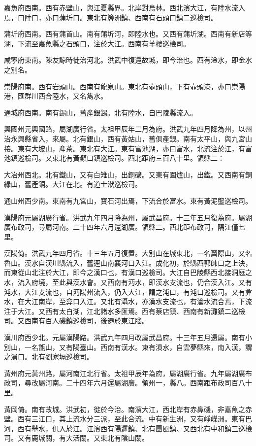 嘉魚府西南。西有赤壁山，與江夏縣界。北岸對烏林。西北濱大江，有陸水流入焉，曰陸口，亦曰蒲圻口。東北有簰洲鎮、西南有石頭口鎮二巡檢司。

蒲圻府西南。西有蒲首山。南有蒲圻河，即陸水也。又西有蒲圻湖。西南有新店等湖，下流至嘉魚縣之石頭口，注於大江。西南有羊樓巡檢司。

咸寧府東南。陳友諒時徙治河北。洪武中復還故城，即今治也。西有淦水，即金水之別名。

崇陽府南。西有岩頭山。西南有龍泉山。東北有壺頭山，下有壺頭港，亦曰崇陽港，匯群川西合陸水，又名雋水。

通城府西南。南有錫山，舊產銀錫。北有陸水，自巴陵縣流入。

興國州元興國路，屬湖廣行省。太祖甲辰年二月為府。洪武九年四月降為州，以州治永興縣省入，來屬。北有銀山，西有黃姑山，舊俱產銀。南有太平山，與九宮山接。東有大坡山，產茶。東北有大江。東有富池湖，亦曰富水，北流注於江，有富池鎮巡檢司。又東北有黃顙口鎮巡檢司。西北距府三百八十里。領縣二：

大冶州西北。北有鐵山，又有白雉山，出銅礦。又東有圍爐山，出鐵。又西南有銅綠山，舊產銅。大江在北。有道士洑巡檢司。

通山州西少南。東南有九宮山，寶石河出焉，下流合於富水。東有黃泥壟巡檢司。

漢陽府元屬湖廣行省。洪武九年四月降為州，屬武昌府。十三年五月復為府。屬湖廣布政司，尋屬河南。二十四年六月還湖廣。領縣二。西北距布政司，隔江僅七里。

漢陽倚。洪武九年四月省。十三年五月復置。大別山在城東北，一名翼際山，又名魯山。漢水自漢川縣流入，舊逕山南襄河口入江。成化初，於縣西郭師口之上決，而東從山北注於大江，即今之漢口也，有漢口巡檢司。大江自巴陵縣西北接洞庭之水，流入府境，至此與漢水會。又西南有沔水，即漢水支流也，仍合漢入江。又有沌水，大江支流也，自沔陽州流入，仍入大江，謂之沌口，有沌口巡檢司。又有弇水，在大江南岸，至弇口入江。又北有灄水，亦漢水支流也，有淪水流合焉，下流注于大江。又西有太白湖，江北諸水多匯焉。西有蔡店鎮、西南有新灘鎮二巡檢司。又西南有百人磯鎮巡檢司，後遷於東江腦。

漢川府西少北。元屬漢陽路。洪武九年四月改屬武昌府。十三年五月還屬。南有小別山，一名甑山，又有陽臺山。西南有漢水。東有溳水，自雲夢縣來，南入漢，謂之溳口。北有劉家塥巡檢司。

黃州府元黃州路，屬河南江北行省。太祖甲辰年為府，屬湖廣行省。九年屬湖廣布政司，尋改屬河南。二十四年六月還屬湖廣。領州一，縣八。西南距布政司百八十里。

黃岡倚。南有故城。洪武初，徙於今治。南濱大江，西北岸有赤鼻磯，非嘉魚之赤壁。西有三江口，其上流水分三派，至此合流。中有新生洲，又有崢嶸洲。東有巴河，西有舉水，俱入於江。江濱西有陽邏鎮、北有團風鎮、又西北有中和鎮三巡檢司。又有鹿城關，有大活關。又東北有陰山關。


